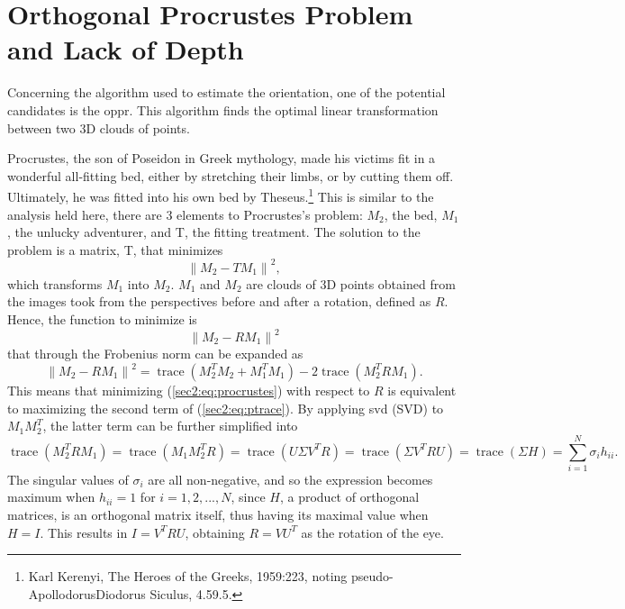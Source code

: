 
\section{Orthogonal Procrustes Problem and Lack of Depth}
\label{cha2:opprandsphere}

Concerning the algorithm used to estimate the orientation, one of the potential candidates is the \acrfull{oppr}. This algorithm finds the optimal linear transformation between two 3D clouds of points.

Procrustes, the son of Poseidon in Greek mythology, made his victims fit in a wonderful all-fitting bed, either by stretching their limbs, or by cutting them off. Ultimately, he was fitted into his own bed by Theseus.\footnote{Karl Kerenyi, The Heroes of the Greeks, 1959:223, noting pseudo-ApollodorusDiodorus Siculus, 4.59.5.} This is similar to the analysis held here, there are 3 elements to Procrustes's problem: $M_2$, the bed, $M_1$, the unlucky adventurer, and T, the fitting treatment. The solution to the problem is a matrix, T, that minimizes
\begin{equation}
\label{sec2:eq:procrustes}
\left \| M_2 - TM_1  \right \|^2 ,
\end{equation}
which transforms $M_1$ into $M_2$. $M_1$ and $M_2$ are clouds of 3D points obtained from the images took from the perspectives before and after a rotation, defined as $R$. Hence, the function to minimize is
\begin{equation}
\label{sec2:eq:ptrace}
\left \| M_2 - RM_1 \right \|^2 
\end{equation}
that through the Frobenius norm can be expanded as
\begin{equation}
\label{sec2:eq:ptrace}
\left \| M_2 - RM_1 \right \|^2 = \operatorname { trace } ( M_2^T M_2 + M_1^T M_1) - 2 \operatorname { trace } (M_2^T R M_1).
\end{equation}
This means that minimizing (\ref{sec2:eq:procrustes}) with respect to $R$ is equivalent to maximizing the second term of (\ref{sec2:eq:ptrace}). By applying \gls{svd} (SVD) to $M_1 M_2^T$, the latter term can be further simplified into
\begin{equation}
\label{sec2:eq:svd}
\operatorname { trace } (M_2^T R M_1) = \operatorname { trace } (M_1 M_2^T  R) = \operatorname { trace } ( U \Sigma V^T R) = \operatorname { trace } (\Sigma V^T R U) = \operatorname { trace } (\Sigma H )  = \sum _ { i = 1 } ^ { N } \sigma _ { i }h _ { i i } .
\end{equation}
The singular values of $\sigma _ { i }$ are all non-negative, and so the expression becomes maximum when $h _ { i i } = 1$ for $i=1,2,...,N$, since $H$, a product of orthogonal matrices, is an orthogonal matrix itself, thus having its maximal value when $H = I$. This results in $I = V^T R U$, obtaining $R=V U^T$ as the rotation of the eye.   

